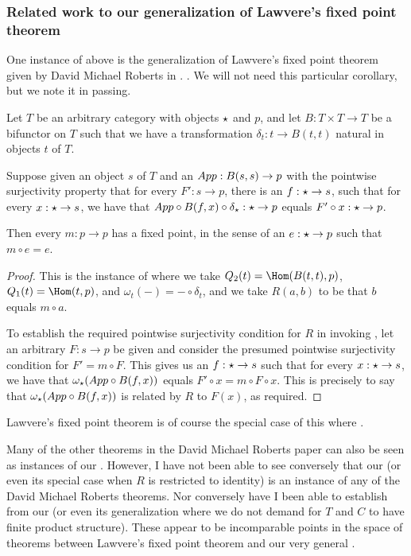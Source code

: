 \subsubsection{Related work to our generalization of Lawvere's fixed point theorem}
One instance of  above is the generalization of Lawvere's fixed point theorem given by David Michael Roberts in . . We will not need this particular corollary, but we note it in passing.
\begin{corollary}\label{DavidMichaelRoberts}
Let $T$ be an arbitrary category with objects $\star$ and $p$, and let $B : T \times T \to T$ be a bifunctor on $T$ such that we have a transformation $\delta_t : t \to B(t, t)$ natural in objects $t$ of $T$.

Suppose given an object $s$ of $T$ and an $App : B(s, s) \to p$ with the pointwise surjectivity property that for every $F' : s \to p$, there is an $f : \star \to s$, such that for every $x : \star \to s$, we have that $App \circ B(f, x) \circ \delta_{\star} : \star \to p$ equals $F' \circ x : \star \to p$.

Then every $m : p \to p$ has a fixed point, in the sense of an $e : \star \to p$ such that $m \circ e = e$.
\end{corollary}
\begin{proof}
This is the instance of  where we take $\Bipresheaf(t) = \Hom(B(t, t), p)$, $\Unipresheaf(t) = \Hom(t, p)$, and $\omega_t(-) = - \circ \delta_t$, and we take $R(a, b)$ to be that $b$ equals $m \circ a$.

To establish the required pointwise surjectivity condition for $R$ in invoking , let an arbitrary $F : s \to p$ be given and consider the presumed pointwise surjectivity condition for $F' = m \circ F$. This gives us an $f : \star \to s$ such that for every $x : \star \to s$, we have that $\omega_{\star} (App \circ B(f, x))$ equals $F' \circ x = m \circ F \circ x$. This is precisely to say that $\omega_{\star} (App \circ B(f, x))$ is related by $R$ to $F(x)$, as required.
\end{proof}
Lawvere's fixed point theorem is of course the special case of this where \TODO.

Many of the other theorems in the David Michael Roberts paper can also be seen as instances of our . However, I have not been able to see conversely that our  (or even its special case when $R$ is restricted to identity) is an instance of any of the David Michael Roberts theorems. Nor conversely have I been able to establish  from our  (or even its generalization where we do not demand for $T$ and $C$ to have finite product structure). These appear to be incomparable points in the space of theorems between Lawvere's fixed point theorem and our very general .


